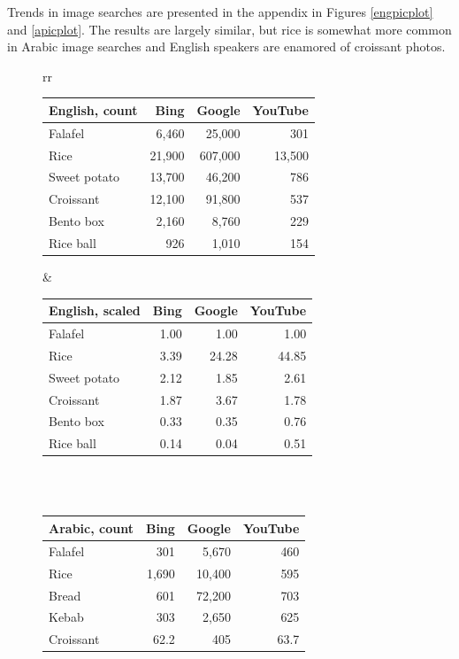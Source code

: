 \documentclass[a4paper,10pt]{article}
\begin{document}
Trends in image searches are presented in the appendix in Figures \ref{engpicplot} and \ref{apicplot}.
The results are largely similar, but rice is somewhat more common in Arabic image searches
and English speakers are enamored of croissant photos.


\begin{figure}
\hspace{-2cm}
\begin{tabular}{rr}

\begin{tabular}{l|rrr}
{\bf English, count} & Bing & Google & YouTube \\\hline
Falafel  & 6,460 & 25,000 & 301\\
Rice    & 21,900 & 607,000 & 13,500\\
Sweet potato & 13,700 & 46,200 & 786\\
Croissant & 12,100 & 91,800 & 537 \\
Bento box & 2,160 & 8,760 & 229 \\
Rice ball & 926 & 1,010 & 154\\
\end{tabular}

&

\begin{tabular}{l|rrr}
{\bf English, scaled} & Bing & Google & YouTube \\\hline

Falafel  &1.00& 1.00 & 1.00 \\
Rice    &3.39&24.28 & 44.85 \\
Sweet potato &2.12& 1.85 & 2.61 \\
Croissant &1.87& 3.67 & 1.78 \\
Bento box &0.33& 0.35 & 0.76 \\
Rice ball &0.14& 0.04 & 0.51
\end{tabular}
\\
\phantom{Filler}\\

\begin{tabular}{l|rrr}
{\bf Arabic, count} & Bing & Google & YouTube \\\hline
Falafel & 301  & 5,670 & 460\\
Rice & 1,690& 10,400 & 595\\
Bread  & 601& 72,200   & 703\\
Kebab & 303 & 2,650   & 625\\
Croissant & 62.2 & 405 & 63.7
\end{tabular}


\end{tabular}
\end{figure}
\end{document}
